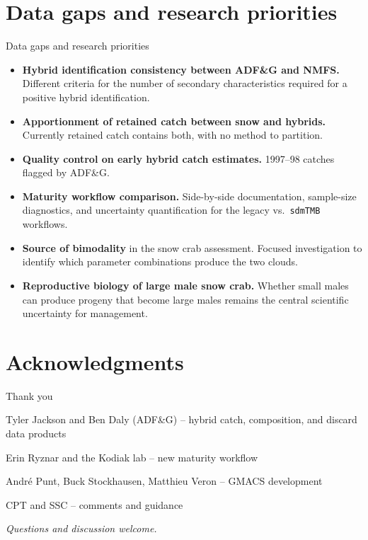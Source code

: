\documentclass[
  10pt,
  ignorenonframetext,
  aspectratio=169,
]{beamer}
\providecommand{\tightlist}{%
  \setlength{\itemsep}{0pt}\setlength{\parskip}{0pt}}
\begin{document}
\section{Data gaps and research
priorities}\label{data-gaps-and-research-priorities}

\begin{frame}[fragile]{Data gaps and research priorities}
\label{data-gaps-and-research-priorities-1}
\small

\begin{itemize}
\tightlist
\item
  \textbf{Hybrid identification consistency between ADF\&G and NMFS.}
  Different criteria for the number of secondary characteristics
  required for a positive hybrid identification.
\item
  \textbf{Apportionment of retained catch between snow and hybrids.}
  Currently retained catch contains both, with no method to partition.
\item
  \textbf{Quality control on early hybrid catch estimates.} 1997--98
  catches flagged by ADF\&G.
\item
  \textbf{Maturity workflow comparison.} Side-by-side documentation,
  sample-size diagnostics, and uncertainty quantification for the legacy
  vs.~\texttt{sdmTMB} workflows.
\item
  \textbf{Source of bimodality} in the snow crab assessment. Focused
  investigation to identify which parameter combinations produce the two
  clouds.
\item
  \textbf{Reproductive biology of large male snow crab.} Whether small
  males can produce progeny that become large males remains the central
  scientific uncertainty for management.
\end{itemize}
\end{frame}

\section{Acknowledgments}\label{acknowledgments}

\begin{frame}{Thank you}
\label{thank-you}
\centering
\Large

Tyler Jackson and Ben Daly (ADF\&G) -- hybrid catch, composition, and
discard data products

\bigskip

Erin Ryznar and the Kodiak lab -- new maturity workflow

\bigskip

André Punt, Buck Stockhausen, Matthieu Veron -- GMACS development

\bigskip

CPT and SSC -- comments and guidance

\bigskip

\normalsize

\textit{Questions and discussion welcome.}
\end{frame}
\end{document}
